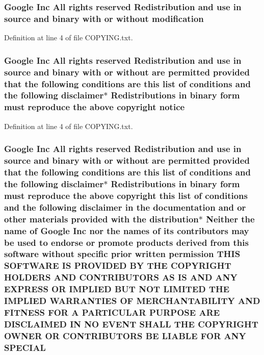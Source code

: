 \subsubsection[{\texorpdfstring{modification}{modification}}]{\setlength{\rightskip}{0pt plus 5cm}Google Inc All rights reserved Redistribution and use in source and binary with or without modification}\hypertarget{COPYING_8txt_a89bb569a92fb501f1f24801a1783986c}{}\label{COPYING_8txt_a89bb569a92fb501f1f24801a1783986c}


Definition at line 4 of file C\+O\+P\+Y\+I\+N\+G.\+txt.

\subsubsection[{\texorpdfstring{notice}{notice}}]{\setlength{\rightskip}{0pt plus 5cm}Google Inc All rights reserved Redistribution and use in source and binary with or without are permitted provided that the following conditions are this {\bf list} of conditions and the following disclaimer$\ast$ Redistributions in binary form must reproduce the above copyright notice}\hypertarget{COPYING_8txt_a24d0b31252030c0ecf84349658ede5de}{}\label{COPYING_8txt_a24d0b31252030c0ecf84349658ede5de}


Definition at line 4 of file C\+O\+P\+Y\+I\+N\+G.\+txt.

\subsubsection[{\texorpdfstring{S\+P\+E\+C\+I\+AL}{SPECIAL}}]{\setlength{\rightskip}{0pt plus 5cm}Google Inc All rights reserved Redistribution and use in source and binary with or without are permitted provided that the following conditions are this {\bf list} of conditions and the following disclaimer$\ast$ Redistributions in binary form must reproduce the above copyright this {\bf list} of conditions and the following disclaimer in the documentation and or other materials provided with the distribution$\ast$ Neither the name of Google Inc nor the names of its contributors may be used to endorse or promote products derived from this software without specific prior written permission T\+H\+IS S\+O\+F\+T\+W\+A\+RE IS P\+R\+O\+V\+I\+D\+ED BY T\+HE C\+O\+P\+Y\+R\+I\+G\+HT H\+O\+L\+D\+E\+RS A\+ND C\+O\+N\+T\+R\+I\+B\+U\+T\+O\+RS AS IS A\+ND A\+NY E\+X\+P\+R\+E\+SS OR I\+M\+P\+L\+I\+ED B\+UT N\+OT L\+I\+M\+I\+T\+ED T\+HE I\+M\+P\+L\+I\+ED {\bf W\+A\+R\+R\+A\+N\+T\+I\+ES} OF M\+E\+R\+C\+H\+A\+N\+T\+A\+B\+I\+L\+I\+TY A\+ND F\+I\+T\+N\+E\+SS F\+OR A P\+A\+R\+T\+I\+C\+U\+L\+AR P\+U\+R\+P\+O\+SE A\+RE D\+I\+S\+C\+L\+A\+I\+M\+ED IN NO E\+V\+E\+NT S\+H\+A\+LL T\+HE C\+O\+P\+Y\+R\+I\+G\+HT O\+W\+N\+ER OR C\+O\+N\+T\+R\+I\+B\+U\+T\+O\+RS BE L\+I\+A\+B\+LE F\+OR A\+NY S\+P\+E\+C\+I\+AL}\hypertarget{COPYING_8txt_a6680f56c922f2de277fe520d9c651d4e}{}\label{COPYING_8txt_a6680f56c922f2de277fe520d9c651d4e}


